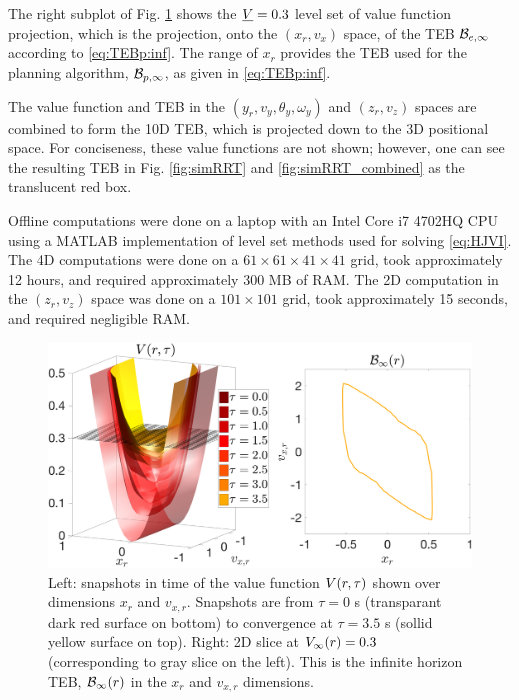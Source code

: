 The right subplot of Fig. \ref{fig:valfuncRRT} shows the $\underline{V} = 0.3$ level set of value function projection, which is the projection, onto the $(x_r, v_x)$ space, of the TEB $\mathcal B_{e, \infty}$ according to \eqref{eq:TEBp:inf}.
The range of $x_r$ provides the TEB used for the planning algorithm, $\mathcal B_{p, \infty}$, as given in \eqref{eq:TEBp:inf}.

The value function and TEB in the $(y_r, v_y, \theta_y, \omega_y)$ and $(z_r, v_z)$ spaces are combined to form the 10D TEB, which is projected down to the 3D positional space.
For conciseness, these value functions are not shown; however, one can see the resulting TEB in Fig. \ref{fig:simRRT} and \ref{fig:simRRT_combined} as the translucent red box.

Offline computations were done on a laptop with an Intel Core i7 4702HQ CPU using a MATLAB implementation of level set methods \cite{Mitchell07c} used for solving \eqref{eq:HJVI}.
The 4D computations were done on a $61\times 61 \times 41 \times 41$ grid, took approximately 12 hours, and required approximately 300 MB of RAM.
The 2D computation in the $(z_r, v_z)$ space was done on a $101 \times 101$ grid, took approximately 15 seconds, and required negligible RAM.

\begin{figure}
  \includegraphics[width=\columnwidth]{fig/Q10D_Q3D/valfunc2}
  \caption{Left: snapshots in time of the value function $V(r,\tau)$ shown over dimensions $x_r$ and $v_{x,r}$.  Snapshots are from $\tau = 0$ s (transparant dark red surface on bottom) to convergence at $\tau = 3.5$ s (sollid yellow surface on top). Right: 2D slice at $V_\infty(r)=0.3$ (corresponding to gray slice on the left). This is the infinite horizon TEB, $\mathcal B_\infty(r)$ in the $x_r$ and $v_{x,r}$ dimensions.}
  \label{fig:valfuncRRT}
\end{figure}

